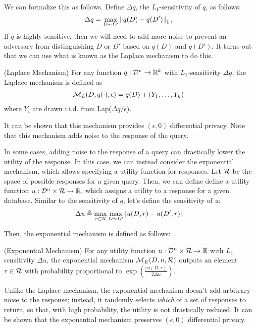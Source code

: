 \documentclass{article} %
\begin{document}
We can formalize this as follows. Define $\Delta q$, the $L_1$-sensitivity of
$q$, as follows:
\begin{align*}
\Delta q = \max_{D \sim D'} \left\lVert q(D) - q(D')\right\rVert_1,
\end{align*}
%
If $q$ is highly sensitive, then we will need to add more noise to prevent an
adversary from distinguishing $D$ or $D'$ based on $q(D)$ and $q(D')$. It turns
out that we can use what is known as the Laplace mechanism to do this.

\begin{definition}{(Laplace Mechanism)}
For any function $q : \mathcal{D}^n \rightarrow \mathbb{R}^k$ with $L_1$-sensitivity
$\Delta q$, the Laplace mechanism is defined as
\begin{align*}
\mathcal{M}_L(D, q(\cdot), \epsilon) = q(D) + (Y_1, \dots, Y_k)
\end{align*}
where $Y_i$ are drawn i.i.d. from Lap($\Delta q / \epsilon$).
\label{def:laplace_mechanism}
\end{definition}

It can be shown that this mechanism provides $(\epsilon, 0)$ differential
privacy. Note that this mechanism adds noise to the response of the query.

In some cases, adding noise to the response of a query can drastically lower
the utility of the response. In this case, we can instead consider the
exponential mechanism, which allows specifying a utility function for responses.
Let $\mathcal{R}$ be the space of possible responses for a given query. Then, we can
define define a utility function $u : \mathcal{D}^n \times \mathcal{R} \rightarrow \mathbb{R}$,
which assigns a utility to a response for a given database. Similar to the
sensitivity of $q$, let's define the sensitivity of $u$:
\begin{align*}
\Delta u \triangleq \max_{r \in \mathcal{R}} \max_{D \sim D'} \left\lvert u(D, r) - u(D', r)\right\rvert
\end{align*}

Then, the exponential mechanism is defined as follows:
\begin{definition}{(Exponential Mechanism)}
For any utility function $u : \mathcal{D}^n \times \mathcal{R} \rightarrow \mathbb{R}$ with $L_1$
sensitivity $\Delta u$, the exponential mechanism $\mathcal{M}_E(D, u, \mathcal{R})$ outputs an
element $r \in \mathcal{R}$ with probability proportional to $\exp{(\frac{\epsilon u(D,
r)}{2 \Delta u})}$.
\label{def:exponential_mechanism}
\end{definition}

Unlike the Laplace mechanism, the exponential mechanism doesn't add arbitrary
noise to the response; instead, it randomly selects \textit{which} of a set of
responses to return, so that, with high probability, the utility is not
drastically reduced. It can be shown that the exponential mechanism preserves
$(\epsilon, 0)$ differential privacy.
\end{document}
